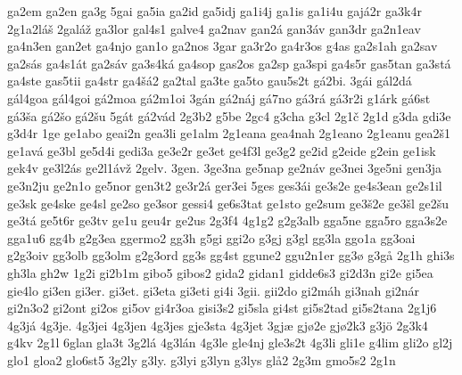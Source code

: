 {    ga2em
    ga2en
    ga3g
    5gai
    ga5ia
    ga2id
    ga5idj
    ga1i4j
    ga1is
    ga1i4u
    gajá2r
    ga3k4r
    2g1a2láš
    2galáž
    ga3lor
    gal4s1
    galve4
    ga2nav
    gan2á
    gan3áv
    gan3dr
    ga2n1eav
    ga4n3en
    gan2et
    ga4njo
    gan1o
    ga2nos
    3gar
    ga3r2o
    ga4r3os
    g4as
    ga2s1ah
    ga2sav
    ga2sás
    ga4s1át
    ga2sáv
    ga3s4ká
    ga4sop
    gas2os
    ga2sp
    ga3spi
    ga4s5r
    gas5tan
    ga3stá
    ga4ste
    gas5tii
    ga4str
    ga4šá2
    ga2tal
    ga3te
    ga5to
    gau5s2t
    gá2bi.
    3gái
    gál2dá
    gál4goa
    gál4goi
    gá2moa
    gá2m1oi
    3gán
    gá2náj
    gá7no
    gá3rá
    gá3r2i
    g1árk
    gá6st
    gá3ša
    gá2šo
    gá2šu
    5gát
    gá2vád
    2g3b2
    g5be
    2gc4
    g3cha
    g3cl
    2g1č
    2g1d
    g3da
    gdi3e
    g3d4r
    1ge
    ge1abo
    geai2n
    gea3li
    ge1alm
    2g1eana
    gea4nah
    2g1eano
    2g1eanu
    gea2š1
    ge1avá
    ge3bl
    ge5d4i
    gedi3a
    ge3e2r
    ge3et
    ge4f3l
    ge3g2
    ge2id
    g2eide
    g2ein
    ge1isk
    gek4v
    ge3l2ás
    ge2l1ávž
    2gelv.
    3gen.
    3ge3na
    ge5nap
    ge2náv
    ge3nei
    3ge5ni
    gen3ja
    ge3n2ju
    ge2n1o
    ge5nor
    gen3t2
    ge3r2á
    ger3ei
    5ges
    ges3ái
    ge3s2e
    ge4s3ean
    ge2s1il
    ge3sk
    ge4ske
    ge4sl
    ge2so
    ge3sor
    gessi4
    ge6s3tat
    ge1sto
    ge2sum
    ge3š2e
    ge3šl
    ge2šu
    ge3tá
    ge5t6r
    ge3tv
    ge1u
    geu4r
    ge2us
    2g3f4
    4g1g2
    g2g3alb
    gga5ne
    gga5ro
    gga3s2e
    gga1u6
    gg4b
    g2g3ea
    ggermo2
    gg3h
    g5gi
    ggi2o
    g3gj
    g3gl
    gg3la
    ggo1a
    gg3oai
    g2g3oiv
    gg3olb
    gg3olm
    g2g3ord
    gg3s
    gg4st
    ggune2
    ggu2n1er
    gg3ø
    g3gå
    2g1h
    ghi3s
    gh3la
    gh2w
    1g2i
    gi2b1m
    gibo5
    gibos2
    gida2
    gidan1
    gidde6s3
    gi2d3n
    gi2e
    gi5ea
    gie4lo
    gi3en
    gi3er.
    gi3et.
    gi3eta
    gi3eti
    gi4i
    3gii.
    gii2do
    gi2máh
    gi3nah
    gi2nár
    gi2n3o2
    gi2ont
    gi2os
    gi5ov
    gi4r3oa
    gisi3s2
    gi5sla
    gi4st
    gi5s2tad
    gi5s2tana
    2g1j6
    4g3já
    4g3je.
    4g3jei
    4g3jen
    4g3jes
    gje3sta
    4g3jet
    3gjæ
    gjø2e
    gjø2k3
    g3jö
    2g3k4
    g4kv
    2g1l
    6glan
    gla3t
    3g2lá
    4g3lán
    4g3le
    gle4nj
    gle3s2t
    4g3li
    gli1e
    g4lim
    gli2o
    gl2j
    glo1
    gloa2
    glo6st5
    3g2ly
    g3ly.
    g3lyi
    g3lyn
    g3lys
    glå2
    2g3m
    gmo5s2
    2g1n
}
